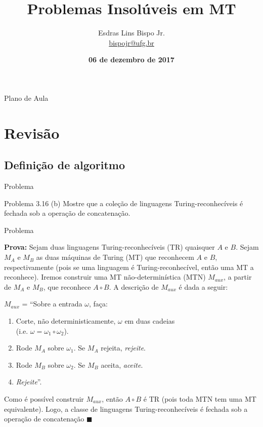 \documentclass[xcolor=dvipsnames,table]{beamer}
\title{Problemas Insolúveis em MT}
\author{
  Esdras Lins Bispo Jr. \\ \url{bispojr@ufg.br}
  }
\institute{
  Teoria da Computação \\Bacharelado em Ciência da Computação}
\date{\textbf{06 de dezembro de 2017} }
\begin{document}
	\begin{frame}
		\titlepage
	\end{frame}

	\AtBeginSection{
		\begin{frame}{Sumário}%
    		\tableofcontents[currentsection]
		\end{frame}
	}

	\begin{frame}{Plano de Aula}
		\tableofcontents
	\end{frame}
	
	
	\section{Revisão}
	\subsection{Definição de algoritmo}
	\begin{frame}{Problema}
		\begin{block}{Problema 3.16 (b)}
			Mostre que a coleção de linguagens Turing-reconhecíveis é fechada sob a operação de concatenação.		
		\end{block}
	\end{frame}
	
	\begin{frame}{Problema} 
		
		{\bf Prova:} Sejam duas linguagens Turing-reconhecíveis (TR) quaisquer $A$ e $B$.   Sejam $M_A$ e $M_B$ as duas máquinas de Turing (MT) que reconhecem $A$ e $B$, respectivamente   (pois se uma linguagem é Turing-reconhecível, então uma MT a reconhece).   Iremos construir uma MT não-determinística (MTN) $M_{aux}$, a partir de $M_A$ e $M_B$, que reconhece $A \circ B$.   A descrição de $M_{aux}$ é dada a seguir:  
		
		$M_{aux}$ = ``Sobre a entrada $\omega$, faça:  
		\begin{enumerate}
			\item Corte, não deterministicamente, $\omega$ em duas cadeias \\(i.e. $\omega = \omega_1 \circ \omega_2$).  
			\item Rode $M_A$ sobre $\omega_1$. Se $M_A$ rejeita, {\it rejeite}.  
			\item Rode $M_B$ sobre $\omega_2$. Se $M_B$ aceita, {\it aceite}.  
			\item {\it Rejeite}''.
		\end{enumerate}  
		
		Como é possível construir $M_{aux}$, então $A \circ B$ é TR   (pois toda MTN tem uma MT equivalente).   Logo, a classe de linguagens Turing-reconhecíveis é fechada sob a operação de concatenação $\blacksquare$
	\end{frame}
	
\end{document}
